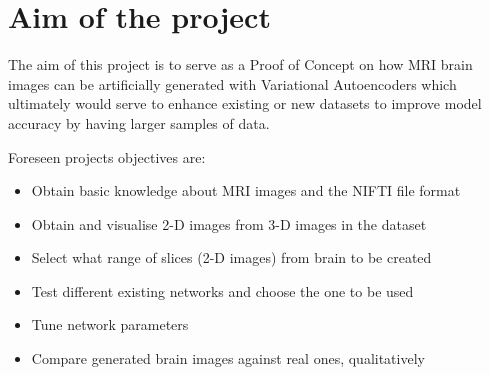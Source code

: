 \section{Aim of the project}

The aim of this project is to serve as a Proof of Concept on how MRI brain images can be artificially generated with Variational Autoencoders which ultimately would serve to enhance existing or new datasets to improve model accuracy by having larger samples of data.

Foreseen projects objectives are:

\begin{itemize}
    \item Obtain basic knowledge about MRI images and the NIFTI file format
    \item Obtain and visualise 2-D images from 3-D images in the dataset
    \item Select what range of slices (2-D images) from brain to be created
    \item Test different existing networks and choose the one to be used
    \item Tune network parameters
    \item Compare generated brain images against real ones, qualitatively
\end{itemize}